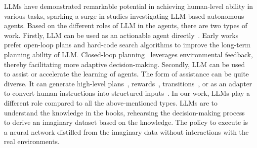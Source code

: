 LLMs have demonstrated remarkable potential in achieving human-level ability in various tasks, sparking a surge in studies investigating LLM-based autonomous agents. Based on the different roles of LLM in the agents, there are two types of work.  
Firstly, LLM can be used 
as an actionable agent directly~\citep{voyager2023guanzhi}. Early works~\citep{cot2022jason, llm-mcts2023zirui} prefer open-loop plans and hard-code search algorithms to improve the long-term planning ability of LLM. Closed-loop planning~\citep{react@2022shunyu, inner@2022wenlong, reflexion@2023noah} leverages environmental feedback, thereby facilitating more adaptive decision-making. 
Secondly, LLM can be used to assist or accelerate the learning of agents. The form of assistance can be quite diverse. It can generate high-level plans~\citep{liu2023llm+, llmplanner@2023song}, rewards~\citep{drlc@2024cao, kwon2023reward, wu2024read}, transitions~\citep{zala2024envgen, ren2024bases}, or as an adapter to convert human instructions into structured inputs~\citep{hu2023instructrl}. In our work, LLMs play a different role compared to all the above-mentioned types. LLMs are to understand the knowledge in the books, rehearsing the decision-making process to derive an imaginary dataset based on the knowledge.  The policy to execute is a neural network distilled from the imaginary data without interactions with the real environments. 
